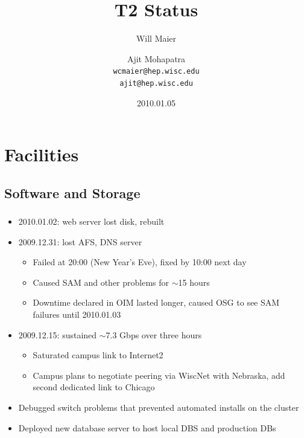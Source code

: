 \documentclass{beamer}
\title{T2 Status}
\author[Maier, Mohapatra]{
    Will Maier \and Ajit Mohapatra\\
    {\tt wcmaier@hep.wisc.edu}\\
    {\tt ajit@hep.wisc.edu}}
\institute[Wisconsin]{University of Wisconsin - High Energy Physics}
\date{2010.01.05}
\newcommand{\ca}{\ensuremath{\sim}}
\begin{document}
\begin{frame}
    \titlepage
\end{frame}


\section{Facilities}
\subsection{Software and Storage}
\begin{frame}
\frametitle{}

\begin{itemize}
	\item 2010.01.02: web server lost disk, rebuilt
	\item 2009.12.31: lost AFS, DNS server
	\begin{itemize}
		\item Failed at 20:00 (New Year's Eve), fixed by 10:00 next day
		\item Caused SAM and other problems for \ca{}15 hours
		\item Downtime declared in OIM lasted longer, caused OSG to see SAM failures until 2010.01.03
	\end{itemize}
	\item 2009.12.15: sustained \ca{}7.3 Gbps over three hours
	\begin{itemize}
		\item Saturated campus link to Internet2
		\item Campus plans to negotiate peering via WiscNet with Nebraska, add second dedicated link to Chicago
	\end{itemize}
	\item Debugged switch problems that prevented automated installs on the cluster
	\item Deployed new database server to host local DBS and production DBs
\end{itemize}
\end{frame}
\end{document}
